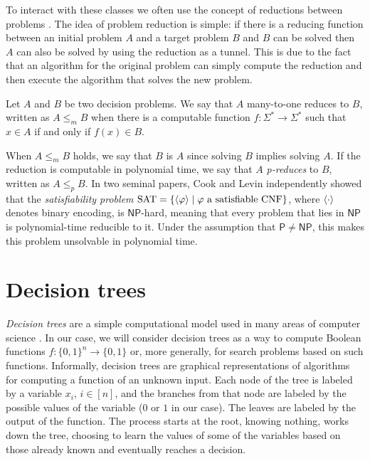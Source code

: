 To interact with these classes we often use the concept of reductions between problems \cite{karp,sip_book}. The idea of problem reduction is simple: if there is a reducing function between an initial problem $A$ and a target problem $B$ and $B$ can be solved then $A$ can also be solved by using the reduction as a tunnel. This is due to the fact that an algorithm for the original problem can simply compute the reduction and then execute the algorithm that solves the new problem.

\begin{definition}
  Let $A$ and $B$ be two decision problems. We say that $A$ many-to-one reduces to $B$, written as $A \leq_m B$ when there is a computable function $f : \Sigma^* \to \Sigma^*$ such that $x \in A$ if and only if $f(x) \in B$. 
\end{definition}

When $A \leq_m B$ holds, we say that $B$ is  $A$ since solving $B$ implies solving $A$. If the reduction is computable in polynomial time, we say that $A$ \textit{p-reduces} to $B$, written as $A \leq_p B$. In two seminal papers, Cook and Levin \cite{cook_sat,levin_fsat} independently showed that the \textit{satisfiability problem} $\mathrm{SAT} = \{\left\langle\varphi\right\rangle \mid \varphi \text{ a satisfiable CNF}\}$, where $\left\langle\cdot\right\rangle$ denotes binary encoding, is $\mathsf{NP}$-hard, meaning that every problem that lies in $\mathsf{NP}$ is polynomial-time reducible to it. Under the assumption that $\mathsf{P} \neq \mathsf{NP}$, this makes this problem unsolvable in polynomial time.

\section{Decision trees}

\textit{Decision trees} are a simple computational model used in many areas of computer science \cite{jukna,arora_barak}. In our case, we will consider decision trees as a way to compute Boolean functions $f : \{0,1\}^n \to \{0,1\}$ or, more generally, for search problems based on such functions. Informally, decision trees are graphical representations of algorithms for computing a function of an unknown input. Each node of the tree is labeled by a variable $x_i$, $i \in [n]$, and the branches from that node are labeled by the possible values of the variable ($0$ or $1$ in our case). The leaves are labeled by the output of the function. The process starts at the root, knowing nothing, works down the tree, choosing to learn the values of some of the variables based on those already known and eventually reaches a decision.


